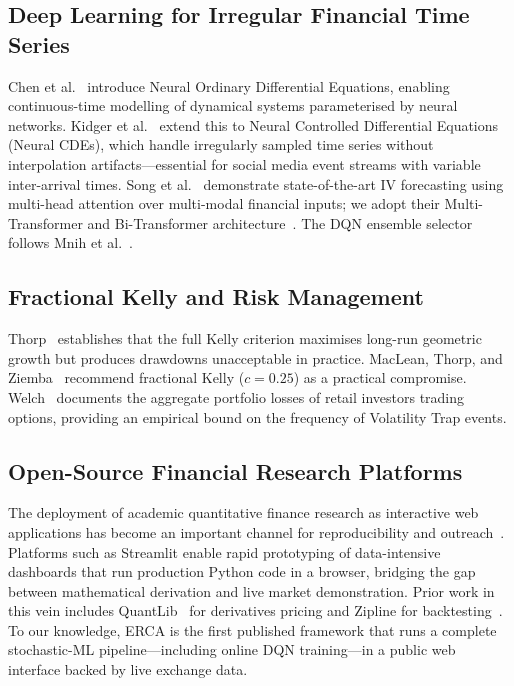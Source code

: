 \documentclass[10pt,twocolumn]{article}
\begin{document}
\subsection{Deep Learning for Irregular Financial Time Series}

Chen et al.~\cite{chen2018} introduce Neural Ordinary Differential Equations,
enabling continuous-time modelling of dynamical systems parameterised by neural
networks. Kidger et al.~\cite{kidger2021} extend this to Neural Controlled
Differential Equations (Neural CDEs), which handle irregularly sampled time
series without interpolation artifacts---essential for social media event
streams with variable inter-arrival times. Song et al.~\cite{song2025}
demonstrate state-of-the-art IV forecasting using multi-head attention over
multi-modal financial inputs; we adopt their Multi-Transformer and
Bi-Transformer architecture~\cite{vaswani2017}.
The DQN ensemble selector follows Mnih et al.~\cite{mnih2015}.

\subsection{Fractional Kelly and Risk Management}

Thorp~\cite{thorp2006} establishes that the full Kelly criterion maximises
long-run geometric growth but produces drawdowns unacceptable in practice.
MacLean, Thorp, and Ziemba~\cite{maclean2011} recommend fractional Kelly
($c=0.25$) as a practical compromise. Welch~\cite{welch2022} documents the
aggregate portfolio losses of retail investors trading options, providing an
empirical bound on the frequency of Volatility Trap events.

\subsection{Open-Source Financial Research Platforms}

The deployment of academic quantitative finance research as interactive
web applications has become an important channel for reproducibility and
outreach~\cite{streamlit2019}. Platforms such as Streamlit enable rapid
prototyping of data-intensive dashboards that run production Python code in a
browser, bridging the gap between mathematical derivation and live market
demonstration. Prior work in this vein includes QuantLib~\cite{quantlib2003}
for derivatives pricing and Zipline for backtesting~\cite{quantopian2012}.
To our knowledge, ERCA is the first published framework that runs a complete
stochastic-ML pipeline---including online DQN training---in a public web
interface backed by live exchange data.
\end{document}
